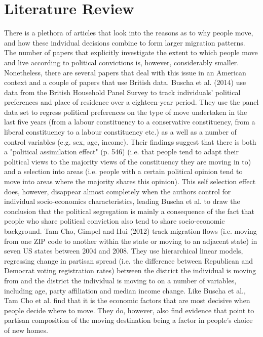 \documentclass[12pt, a4paper]{article}
\begin{document}
\section{Literature Review}\label{lit}
There is a plethora of articles that look into the reasons as to why people move, and how these indvidual decisions combine to form larger migration patterns. The number of papers that explicitly investigate the extent to which people move and live according to political convictions is, however, considerably smaller. Nonetheless, there are several papers that deal with this issue in an American context and a couple of papers that use British data. 
\newline Buscha et al. (2014) use data from the British Household Panel Survey to track individuals' political preferences and place of residence over a eighteen-year period. They use the panel data set to regress political preferences on the type of move undertaken in the last five years (from a labour constituency to a conservative constituency, from a liberal constituency to a labour constituency etc.) as a well as a number of control variables (e.g. sex, age, income). Their findings suggest that there is both a "political assimilation effect" (p. 546) (i.e. that people tend to adapt their political views to the majority views of the constituency they are moving in to) and a selection into areas (i.e. people with a certain political opinion tend to move into areas where the majority shares this opinion). This self selection effect does, however, disappear almost completely when the authors control for individual socio-economics characteristics, leading Buscha et al. to draw the conclusion that the political segregation is mainly a consequence of the fact that people who share political conviction also tend to share socio-economic background.    
\newline Tam Cho, Gimpel and Hui (2012) track migration flows (i.e. moving from one ZIP code to another within the state or moving to an adjacent state) in seven US states between 2004 and 2008. They use hierarchical linear models, regressing change in partisan spread (i.e. the difference between Republican and Democrat voting registration rates) between the district the individual is moving from and the district the individual is moving to on a number of variables, including age, party affiliation and median income change. Like Buscha et al., Tam Cho et al. find that it is the economic factors that are most decisive when people decide where to move. They do, however, also find evidence that point to partisan composition of the moving destination being a factor in people's choice of new homes. 
\end{document}
